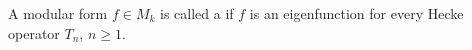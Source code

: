 A modular form $f \in M_k$ is called a  if $f$ is an eigenfunction for every Hecke operator $T_n$, $n \geq 1$.
